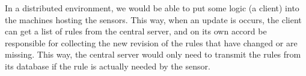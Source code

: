 In a distributed environment, we would be able to put some logic (a client) into
the machines hosting the sensors. This way, when an update is occurs, the
client can get a list of rules from the central server, and on its own accord
be responsible for collecting the new revision of the rules that have changed or
are missing. This way, the central server would only need to transmit the
rules from its database if the rule is actually needed by the sensor.
\newpage




